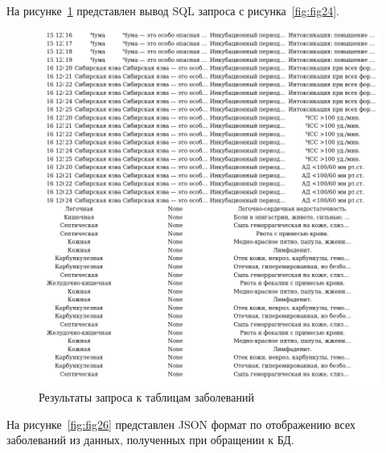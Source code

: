 На рисунке~\ref{fig:fig25} представлен вывод SQL запроса с рисунка~\ref{fig:fig24}.

\begin{figure}
  \includegraphics[scale=0.87]{inc/json_sh_dis_part_name1}
  \caption{Результаты запроса к таблицам заболеваний}
  \label{fig:fig25}
\end{figure}

На рисунке~\ref{fig:fig26} представлен JSON формат по отображению всех заболеваний из данных, полученных при обращении к БД.

